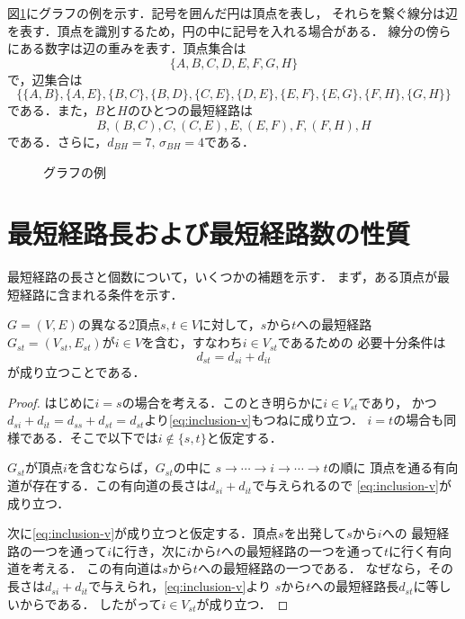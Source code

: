 \begin{example}
  図\ref{fig:graph-diamond}にグラフの例を示す．記号を囲んだ円は頂点を表し，
  それらを繋ぐ線分は辺を表す．頂点を識別するため，円の中に記号を入れる場合がある．
  線分の傍らにある数字は辺の重みを表す．頂点集合は
  \[ \{A,B,C,D,E,F,G,H\} \]
  で，辺集合は
  \[ \{\{A,B\},\{A,E\},\{B,C\},\{B,D\},\{C,E\},\{D,E\},\{E,F\},\{E,G\},\{F,H\},\{G,H\}\} \]
  である．また，$B$と$H$のひとつの最短経路は
  \[ B,(B,C),C,(C,E),E,(E,F),F,(F,H),H \]
  である．さらに，$d_{BH}=7,\,\sigma_{BH}=4$である．
  \begin{figure}
    \centering
    \def\svgwidth{.45\textwidth}
    
    \caption{グラフの例}
    \label{fig:graph-diamond}
  \end{figure}
\end{example}

\section{最短経路長および最短経路数の性質}
\label{sect:shortest-paths}

最短経路の長さと個数について，いくつかの補題を示す．
まず，ある頂点が最短経路に含まれる条件を示す．

\begin{lemma}
  \label{lemma:inclusion-v}
  $G=(V,E)$の異なる2頂点$s,t \in V$に対して，$s$から$t$への最短経路
  $G_{st}=(V_{st},E_{st})$が$i \in V$を含む，すなわち$i \in V_{st}$であるための
  必要十分条件は
  \begin{equation}
    d_{st}=d_{si}+d_{it}
    \label{eq:inclusion-v}
  \end{equation}
  が成り立つことである．
\end{lemma}
\begin{proof}
  はじめに$i=s$の場合を考える．このとき明らかに$i \in V_{st}$であり，
  かつ$d_{si}+d_{it}=d_{ss}+d_{st}=d_{st}$より\eqref{eq:inclusion-v}もつねに成り立つ．
  $i=t$の場合も同様である．そこで以下では$i \not\in \{s,t\}$と仮定する．

  $G_{st}$が頂点$i$を含むならば，$G_{st}$の中に
  $s \rightarrow \cdots \rightarrow i \rightarrow \cdots \rightarrow t$の順に
  頂点を通る有向道が存在する．この有向道の長さは$d_{si}+d_{it}$で与えられるので
  \eqref{eq:inclusion-v}が成り立つ．

  次に\eqref{eq:inclusion-v}が成り立つと仮定する．頂点$s$を出発して$s$から$i$への
  最短経路の一つを通って$i$に行き，次に$i$から$t$への最短経路の一つを通って$t$に行く有向道を考える．
  この有向道は$s$から$t$への最短経路の一つである．
  なぜなら，その長さは$d_{si}+d_{it}$で与えられ，\eqref{eq:inclusion-v}より
  $s$から$t$への最短経路長$d_{st}$に等しいからである．
  したがって$i \in V_{st}$が成り立つ．
\end{proof}

